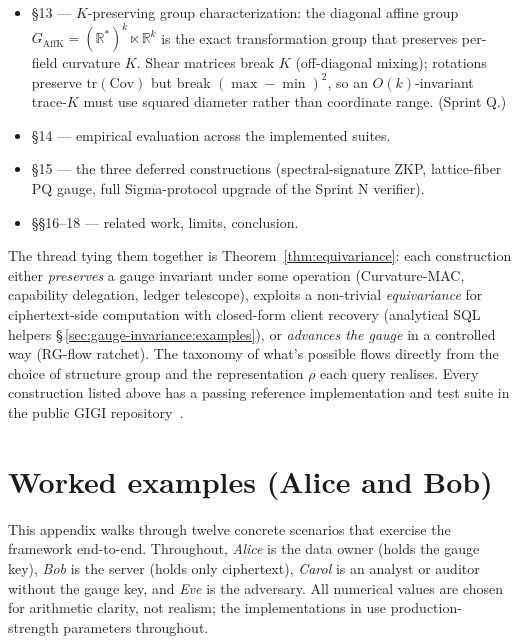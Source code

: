 \documentclass[11pt,letterpaper]{article}
\begin{document}
\begin{itemize}[nosep,leftmargin=*]
  Mahalanobis-distance index with $\chi^2(k, 1-\alpha)$ threshold
  (exact table for $k \in \{1,\ldots,5\}$ at $p \in \{0.95, 0.99\}$
  with Wilson--Hilferty cubic fallback elsewhere); scalar-gauge
  ball preserved, per-field gauge handled via induced ellipsoidal
  Mahalanobis metric. (Sprint P.)
\item \S 13 --- $K$-preserving group characterization: the diagonal
  affine group
  $G_{\mathrm{AffK}} = (\mathbb{R}^*)^k \ltimes \mathbb{R}^k$ is
  the exact transformation group that preserves per-field
  curvature $K$. Shear matrices break $K$ (off-diagonal mixing);
  rotations preserve $\mathrm{tr}(\mathrm{Cov})$ but break
  $(\max - \min)^2$, so an $O(k)$-invariant trace-$K$ must use
  squared diameter rather than coordinate range. (Sprint Q.)
\item \S 14 --- empirical evaluation across the implemented suites.
\item \S 15 --- the three deferred constructions (spectral-signature
  ZKP, lattice-fiber PQ gauge, full Sigma-protocol upgrade of the
  Sprint N verifier).
\item \S\S 16--18 --- related work, limits, conclusion.
\end{itemize}

The thread tying them together is
Theorem~\ref{thm:equivariance}: each construction either
\emph{preserves} a gauge invariant under some operation
(Curvature-MAC, capability delegation, ledger telescope), exploits
a non-trivial \emph{equivariance} for ciphertext-side computation
with closed-form client recovery (analytical SQL helpers
\S\,\ref{sec:gauge-invariance:examples}), or \emph{advances the
gauge} in a controlled way (RG-flow ratchet). The taxonomy of
what's possible flows directly from the choice of structure group
and the representation $\rho$ each query realises. Every
construction listed above has a passing reference implementation
and test suite in the public GIGI repository~\cite{gigi2026code}.


\appendix
\section{Worked examples (Alice and Bob)}
\label{sec:appendix:examples}

This appendix walks through twelve concrete scenarios that
exercise the framework end-to-end. Throughout, \emph{Alice} is
the data owner (holds the gauge key), \emph{Bob} is the server
(holds only ciphertext), \emph{Carol} is an analyst or auditor
without the gauge key, and \emph{Eve} is the adversary. All
numerical values are chosen for arithmetic clarity, not
realism; the implementations in \cite{gigi2026code} use
production-strength parameters throughout.
\end{document}

